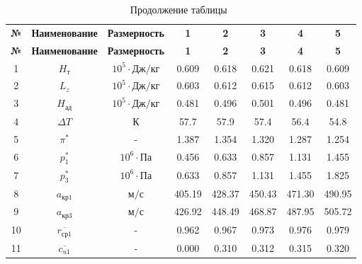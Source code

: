 	\begin{center}
		\begin{longtable}{|c|c|c|c|c|c|c|c|}
			\caption{Сводная таблица параметров КВД} \label{tab:hpc-stage-total}
			\endfirsthead
			\caption*{\tabcapalign Продолжение таблицы~\thetable}\\[-0.45\onelineskip]
			\hline
			\textbf{№} &
			\textbf{Наименование} &
			\textbf{Размерность} &
			\textbf{1} &
			\textbf{2} &
			\textbf{3} &
			\textbf{4} &
			\textbf{5} \\\hline
			\endhead
			\hline
			\textbf{№} &
			\textbf{Наименование} &
			\textbf{Размерность} &
			\textbf{1} &
			\textbf{2} &
			\textbf{3} &
			\textbf{4} &
			\textbf{5}  \\\hline
			
				1 & $H_т$ & $10^5 \cdot Дж/кг$ & 0.609 & 0.618 & 0.621 & 0.618 & 0.609 \\\hline
			
				2 & $L_z$ & $10^5 \cdot Дж/кг$ & 0.603 & 0.612 & 0.615 & 0.612 & 0.603 \\\hline
			
				3 & $H_{ад}$ & $10^5 \cdot Дж/кг$ & 0.481 & 0.496 & 0.501 & 0.496 & 0.481 \\\hline
			
				4 & $\Delta T$ & $К$ & 57.7 & 57.9 & 57.4 & 56.4 & 54.8 \\\hline
			
				5 & $\pi^*$ & - & 1.387 & 1.354 & 1.320 & 1.287 & 1.254 \\\hline
			
				6 & $p_1^*$ & $10^6 \cdot Па$ & 0.456 & 0.633 & 0.857 & 1.131 & 1.455 \\\hline
			
				7 & $p_3^*$ & $10^6 \cdot Па$ & 0.633 & 0.857 & 1.131 & 1.455 & 1.825 \\\hline
			
				8 & $a_{кр1}$ & $м/с$ & 405.19 & 428.37 & 450.43 & 471.30 & 490.95 \\\hline
			
				9 & $a_{кр3}$ & $м/с$ & 426.92 & 448.49 & 468.87 & 487.95 & 505.72 \\\hline
			
				10 & $\overline{r_{ср1}}$ & - & 0.962 & 0.967 & 0.973 & 0.976 & 0.979 \\\hline
			
				11 & $\overline{c_{u1}}$ & - & 0.000 & 0.310 & 0.312 & 0.315 & 0.320 \\\hline
			

\end{longtable}
\end{center}
